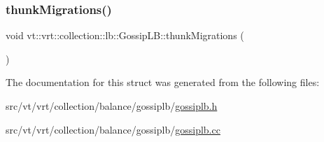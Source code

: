 \mbox{\label{structvt_1_1vrt_1_1collection_1_1lb_1_1_gossip_l_b_a7693c8b06ab78ef3565687621d810450}} 
\subsubsection{\texorpdfstring{thunk\+Migrations()}{thunkMigrations()}}
{\footnotesize\ttfamily void vt\+::vrt\+::collection\+::lb\+::\+Gossip\+L\+B\+::thunk\+Migrations (\begin{DoxyParamCaption}{ }\end{DoxyParamCaption})\hspace{0.3cm}{\ttfamily [protected]}}



The documentation for this struct was generated from the following files\+:\begin{DoxyCompactItemize}
\item 
src/vt/vrt/collection/balance/gossiplb/\hyperlink{gossiplb_8h}{gossiplb.\+h}\item 
src/vt/vrt/collection/balance/gossiplb/\hyperlink{gossiplb_8cc}{gossiplb.\+cc}\end{DoxyCompactItemize}
